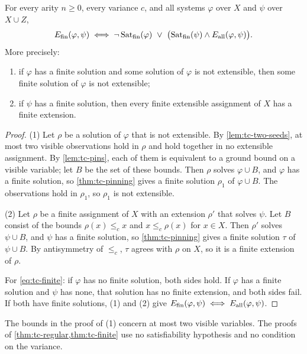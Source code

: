 \begin{theorem}\label{thm:tc-finite}
For every arity $n\ge0$, every variance $c$, and all systems $\varphi$ over
$X$ and $\psi$ over $X\cup Z$,
\begin{equation}\label{eq:tc-finite}
 E_{\mathrm{fin}}(\varphi,\psi)\iff
 \neg\operatorname{Sat}_{\mathrm{fin}}(\varphi)\ \lor\
 \bigl(\operatorname{Sat}_{\mathrm{fin}}(\psi)\land E_{\mathrm{all}}(\varphi,\psi)\bigr).
\end{equation}
More precisely:
\begin{enumerate}[leftmargin=*]
\item if $\varphi$ has a finite solution and some solution of $\varphi$ is
  not extensible, then some finite solution of $\varphi$ is not extensible;
\item if $\psi$ has a finite solution, then every finite extensible assignment
  of $X$ has a finite extension.
\end{enumerate}
\end{theorem}

\begin{proof}
(1) Let $\rho$ be a solution of $\varphi$ that is not extensible. By
\cref{lem:tc-two-seeds}, at most two visible observations hold in $\rho$ and
hold together in no extensible assignment. By \cref{lem:tc-pins}, each of them
is equivalent to a ground bound on a visible variable; let $B$ be the set of
these bounds. Then $\rho$ solves $\varphi\cup B$, and $\varphi$ has a finite
solution, so \cref{thm:tc-pinning} gives a finite solution $\rho_1$ of
$\varphi\cup B$. The observations hold in $\rho_1$, so $\rho_1$ is not
extensible.

(2) Let $\rho$ be a finite assignment of $X$ with an extension $\rho'$ that
solves $\psi$. Let $B$ consist of the bounds $\rho(x)\le_cx$ and
$x\le_c\rho(x)$ for $x\in X$. Then $\rho'$ solves $\psi\cup B$, and $\psi$ has
a finite solution, so \cref{thm:tc-pinning} gives a finite solution $\tau$ of
$\psi\cup B$. By antisymmetry of $\le_c$, $\tau$ agrees with $\rho$ on $X$, so
it is a finite extension of $\rho$.

For \cref{eq:tc-finite}: if $\varphi$ has no finite solution, both sides
hold. If $\varphi$ has a finite solution and $\psi$ has none, that solution
has no finite extension, and both sides fail. If both have finite solutions,
(1) and (2) give $E_{\mathrm{fin}}(\varphi,\psi)\iff E_{\mathrm{all}}(\varphi,\psi)$.
\end{proof}

The bounds in the proof of (1) concern at most two visible variables. The
proofs of \cref{thm:tc-regular,thm:tc-finite} use no satisfiability hypothesis
and no condition on the variance.


